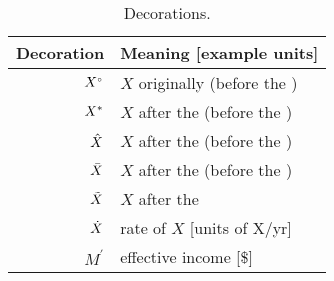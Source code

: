 \begin{table}
\footnotesize
\centering %
\caption{Decorations.}
\begin{tabular}{r l}
  \toprule
  Decoration & Meaning [example units] \\
  \midrule
  ${}{X}^{\scriptscriptstyle \circ}$ & $X$ originally (before the \empleffect{}) \\
  ${X}^*$  & $X$ after the \empleffect{} (before the \subeffect{}) \\
  $\hat{X}$ & $X$ after the \subeffect{} (before the \inceffect{}) \\
  $\bar{X}$ & $X$ after the \inceffect{} (before the \macroeffect{}) \\
  $\tilde{X}$ & $X$ after the \macroeffect{} \\
  $\dot{X}$ & rate of $X$ [units of X/yr] \\
  $M^\prime$ & effective income [\$] \\
  \bottomrule
\end{tabular}
\label{tab:decorations}
\end{table}



